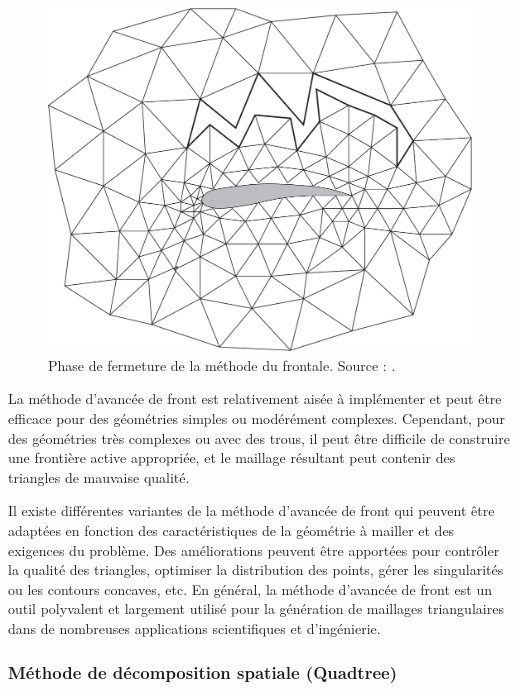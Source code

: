 \begin{figure}[!h]
    \centering
    \includegraphics[scale=0.4]{images/moving front method.png}
    \caption{Phase de fermeture de la méthode du frontale. Source : \cite{baker2005mesh}.}
    \label{fig:moving_front_method}
\end{figure}


La méthode d'avancée de front est relativement aisée à implémenter et peut être efficace pour des géométries simples ou modérément complexes. Cependant, pour des géométries très complexes ou avec des trous, il peut être difficile de construire une frontière active appropriée, et le maillage résultant peut contenir des triangles de mauvaise qualité.

Il existe différentes variantes de la méthode d'avancée de front qui peuvent être adaptées en fonction des caractéristiques de la géométrie à mailler et des exigences du problème. Des améliorations peuvent être apportées pour contrôler la qualité des triangles, optimiser la distribution des points, gérer les singularités ou les contours concaves, etc. En général, la méthode d'avancée de front est un outil polyvalent et largement utilisé pour la génération de maillages triangulaires dans de nombreuses applications scientifiques et d'ingénierie.

\subsubsection{Méthode de décomposition spatiale (Quadtree)}

